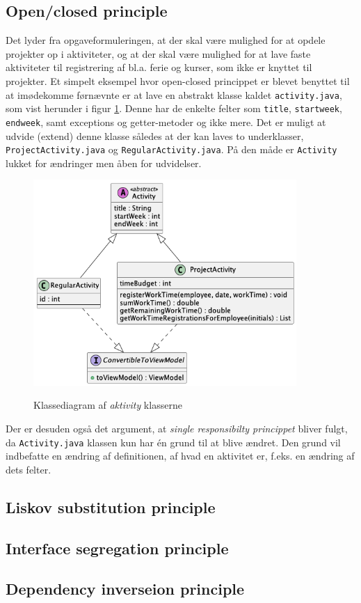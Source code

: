 \subsection{Open/closed principle} \label{sec:solid_o}
Det lyder fra opgaveformuleringen, at der skal være mulighed for at opdele projekter op i aktiviteter, og at der skal være mulighed for at lave faste aktiviteter til registrering af bl.a. ferie og kurser, som ikke er knyttet til projekter. Et simpelt eksempel hvor open-closed princippet er blevet benyttet til at imødekomme førnævnte er at lave en abstrakt klasse kaldet \texttt{activity.java}, som vist herunder i figur \ref{fig:class_open_closed_example}. Denne har de enkelte felter som \texttt{title}, \texttt{startweek}, \texttt{endweek}, samt exceptions og getter-metoder og ikke mere. Det er muligt at udvide (extend) denne klasse således at der kan laves to underklasser, \texttt{ProjectActivity.java} og \texttt{RegularActivity.java}. På den måde er \texttt{Activity} lukket for ændringer men åben for udvidelser. 
\begin{figure}[H]
    \centering
    \caption{Klassediagram af \textit{aktivity} klasserne}
    \includegraphics[width = 10cm, keepaspectratio]{TaskFusion/out/assets/diagrams/class_open_closed_example/open_closed.png}
    \label{fig:class_open_closed_example}
\end{figure}

Der er desuden også det argument, at \textit{single responsibilty princippet} bliver fulgt, da \texttt{Activity.java} klassen kun har én grund til at blive ændret. Den grund vil indbefatte en ændring af definitionen, af hvad en aktivitet er, f.eks. en ændring af dets felter.

\subsection{Liskov substitution principle} \label{sec:solid_l}




\subsection{Interface segregation principle} \label{sec:solid_i}




\subsection{Dependency inverseion principle} \label{sec:solid_d}


